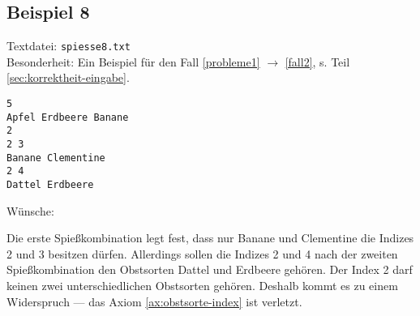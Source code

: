 \subsection{Beispiel 8}\label{example:8}
Textdatei: \texttt{spiesse8.txt}\\
Besonderheit: Ein Beispiel für den Fall \ref{probleme1} $\rightarrow$ \ref{fall2}, s. Teil \ref{sec:korrektheit-eingabe}.
\begin{verbatim}
5
Apfel Erdbeere Banane
2
2 3
Banane Clementine
2 4
Dattel Erdbeere
\end{verbatim}

\noindent
Wünsche: 
\vspace{0.25cm}

\noindent
{}
\vspace{0.25cm}

Die erste Spießkombination legt fest, dass nur Banane und Clementine die Indizes 2 und 3 besitzen dürfen.
Allerdings sollen die Indizes 2 und 4 nach der zweiten Spießkombination den Obstsorten Dattel und Erdbeere 
gehören. Der Index 2 darf keinen zwei unterschiedlichen Obstsorten gehören.
Deshalb kommt es zu einem Widerspruch --- das Axiom \ref{ax:obstsorte-index} ist verletzt.